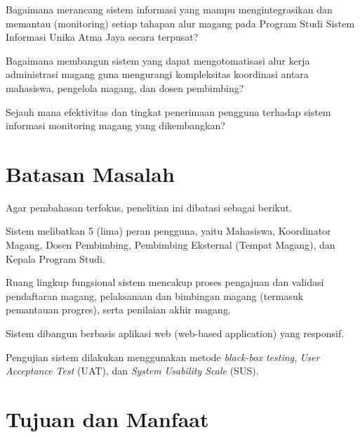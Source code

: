 \begin{rumusanmasalah}
    \item Bagaimana merancang sistem informasi yang mampu mengintegrasikan dan memantau 
          (monitoring) setiap tahapan alur magang pada Program Studi Sistem Informasi 
          Unika Atma Jaya secara terpusat?\label{rq:rancang}
    \item Bagaimana membangun sistem yang dapat mengotomatisasi alur kerja administrasi 
          magang guna mengurangi kompleksitas koordinasi antara mahasiswa, pengelola magang, 
          dan dosen pembimbing?\label{rq:otomasi}
    \item Sejauh mana efektivitas dan tingkat penerimaan pengguna terhadap sistem informasi 
          monitoring magang yang dikembangkan?\label{rq:efektivitas}
\end{rumusanmasalah}

\section{Batasan Masalah}
Agar pembahasan terfokus, penelitian ini dibatasi sebagai berikut.

\begin{daftarnomor}
    \item Sistem melibatkan 5 (lima) peran pengguna, yaitu Mahasiswa, Koordinator Magang, 
          Dosen Pembimbing, Pembimbing Eksternal (Tempat Magang), dan Kepala Program Studi.
    \item Ruang lingkup fungsional sistem mencakup proses pengajuan dan validasi pendaftaran 
          magang, pelaksanaan dan bimbingan magang (termasuk pemantauan progres), serta 
          penilaian akhir magang.
    \item Sistem dibangun berbasis aplikasi web (web-based application) yang responsif.
    \item Pengujian sistem dilakukan menggunakan metode \textit{black-box testing}, 
          \textit{User Acceptance Test} (UAT), dan \textit{System Usability Scale} (SUS).
\end{daftarnomor}

\section{Tujuan dan Manfaat}

